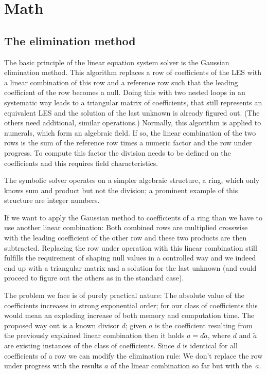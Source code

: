 \chapter{Math}

\section{The elimination method}
\label{secEliminationMethod}

The basic principle of the linear equation system solver is the Gaussian
elimination method. This algorithm replaces a row of coefficients of the
LES with a linear combination of this row and a reference row such that
the leading coefficient of the row becomes a null. Doing this with two
nested loops in an systematic way leads to a triangular matrix of
coefficients, that still represents an equivalent LES and the solution of
the last unknown is already figured out. (The others need additional,
similar operations.) Normally, this algorithm is applied to numerals,
which form an algebraic field. If so, the linear combination of the two
rows is the sum of the reference row times a numeric factor and the row
under progress. To compute this factor the division needs to be defined on
the coefficients and this requires field characteristics.

The symbolic solver operates on a simpler algebraic structure, a ring,
which only knows sum and product but not the division; a prominent example
of this structure are integer numbers.

If we want to apply the Gaussian method to coefficients of a ring than we
have to use another linear combination: Both combined rows are multiplied
crosswise with the leading coefficient of the other row and these two
products are then subtracted. Replacing the row under operation with this
linear combination still fulfills the requirement of shaping null values
in a controlled way and we indeed end up with a triangular matrix and a
solution for the last unknown (and could proceed to figure out the others
as in the standard case).

The problem we face is of purely practical nature: The absolute value of
the coefficients increases in strong exponential order; for our class of
coefficients this would mean an exploding increase of both memory and
computation time. The proposed way out is a known divisor $d$; given $a$
is the coefficient resulting from the previously explained linear
combination then it holds $a = d \tilde a$, where $d$ and $\tilde a$ are
existing instances of the class of coefficients. Since $d$ is identical
for all coefficients of a row we can modify the elimination rule: We
don't replace the row under progress with the results $a$ of the linear
combination so far but with the~$\tilde a$.

